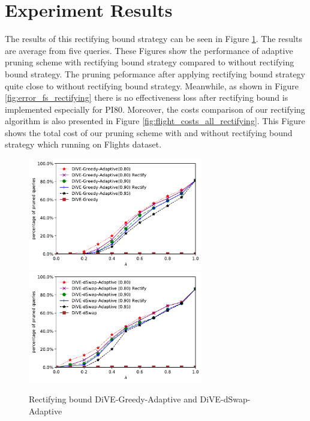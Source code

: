 \documentclass{article}
\begin{document}
\section{Experiment Results}
The results of this rectifying bound strategy can be seen in Figure \ref{fig:rectifying_bound}. The results are average from five queries. These Figures show the performance of adaptive pruning scheme with rectifying bound strategy compared to without rectifying bound strategy. The pruning peformance after applying rectifying bound strategy quite close to without rectifying bound strategy. Meanwhile, as shown in Figure \ref{fig:error_fs_rectifying} there is no effectiveness loss after rectifying bound is implemented especially for PI80. Moreover, the costs comparison of our rectifying algorithm is also presented in Figure \ref{fig:flight_costs_all_rectifying}. This Figure shows the total cost of our pruning scheme with and without rectifying bound strategy which running on Flights dataset. 





\begin{figure}
	\begin{center}
		\includegraphics[width=3.0in]{figures/pruning_performance_greedy_adaptive_rectifying_compare}
		\includegraphics[width=3.0in]{figures/pruning_performance_dswap_adaptive_rectifying_compare}
		\caption{Rectifying bound DiVE-Greedy-Adaptive and DiVE-dSwap-Adaptive}
		\label{fig:rectifying_bound}
	\end{center}
\end{figure}
\end{document}
